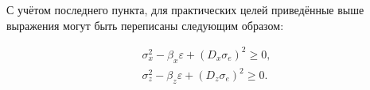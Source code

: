 \documentclass[../thesis.tex]{subfiles}
\begin{document}
	\noindent
	С учётом последнего пункта, для практических целей приведённые выше выражения могут быть
	переписаны следующим образом:

	\begin{align}
		\sigma_{x}^{2}- \beta_{x}\varepsilon + (D_{x}\sigma_{e})^{2}\ge 0, \\
		\sigma_{z}^{2}- \beta_{z}\varepsilon + (D_{z}\sigma_{e})^{2}\ge 0.
	\end{align}
\end{document}
